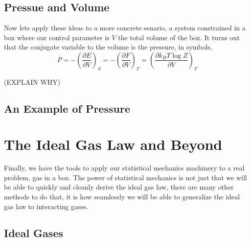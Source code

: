 \documentclass[11pt,a4paper]{article}
\newcommand{\cderiv}[3]{\left(\frac{\partial{#1}}{\partial{#2}}\right)_{#3}}
\theoremstyle{theorem}
\theoremstyle{definition}
\theoremstyle{definition}
\theoremstyle{remark}
\theoremstyle{definition}
\theoremstyle{remark}
\begin{document}
\subsection{Pressue and Volume}

Now lets apply these ideas to a more concrete senario, a system constrained in a box where our control parameter is $V$ the total volume of the box. It turns out that the conjugate variable to the volume is the pressure, in symbols,
\[ P = - \cderiv{E}{V}{S} = - \cderiv{F}{V}{T}  =\cderiv{k_B T \log{Z}}{V}{T} \]

(EXPLAIN WHY)

\subsection{An Example of Pressure}

\section{The Ideal Gas Law and Beyond}

Finally, we have the tools to apply our statistical mechanics machinery to a real problem, gas in a box. The power of statistical mechanics is not just that we will be able to quickly and cleanly derive the ideal gas law, there are many other methods to do that, it is how seamlessly we will be able to generalize the ideal gas law to interacting gases.

\subsection{Ideal Gases}
\end{document}
